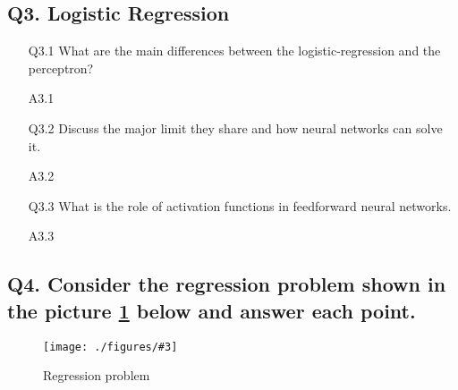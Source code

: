 \documentclass[unicode, 11pt, a4paper]{scrartcl}
\newcommand{\myFigure}[3]{
    \begin{figure}[htbp]
    \centering
    \caption{#1}
    \label{#2}
    \texttt{[image: ./figures/\#3]}
    \end{figure}
}
\begin{document}
\subsection*{Q3. Logistic Regression}
\begin{itemize}
	\item[Q3.1] What are the main differences between the logistic-regression and the perceptron?
	\item[A3.1] ~\\

	\item[Q3.2] Discuss the major limit they share and how neural networks can solve it.
	\item[A3.2] ~\\

	\item[Q3.3] What is the role of activation functions in feedforward neural networks.
	\item[A3.3] ~\\
\end{itemize}

\subsection*{
	Q4. Consider the regression problem shown in the picture \ref{fig:ex-q4-regression}
	below and answer each point.
}

\myFigure{Regression problem}{fig:ex-q4-regression}{parabolic.jpg}
\end{document}
